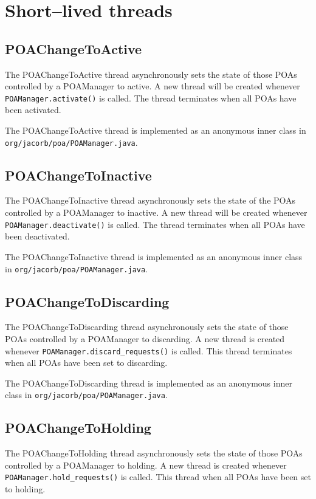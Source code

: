 \section*{Short--lived threads}

\subsection*{POAChangeToActive}
The POAChangeToActive thread asynchronously sets the state of those POAs
controlled by a POAManager to active. A new thread will be created whenever
{\tt POAManager.activate()} is called. The thread terminates when all POAs
have been activated.

The POAChangeToActive thread is implemented as an anonymous inner class in
{\tt org/jacorb/poa/POAManager.java}.

\subsection*{POAChangeToInactive}
The POAChangeToInactive thread asynchronously sets the state of the POAs
controlled by a POAManager to inactive. A new thread will be created whenever
{\tt POAManager.deactivate()} is called. The thread terminates when all
POAs have been deactivated.

The POAChangeToInactive thread is implemented as an anonymous inner class in
{\tt org/jacorb/poa/POAManager.java}.

\subsection*{POAChangeToDiscarding}
The POAChangeToDiscarding thread asynchronously sets the state of those POAs
controlled by a POAManager to discarding. A new thread is created whenever
{\tt POAManager.discard\_requests()} is called. This thread terminates when
all POAs have been set to discarding.

The POAChangeToDiscarding thread is implemented as an anonymous inner class in
{\tt org/jacorb/poa/POAManager.java}.

\subsection*{POAChangeToHolding}
The POAChangeToHolding thread asynchronously sets the state of those POAs
controlled by a POAManager to holding. A new thread is created whenever
{\tt POAManager.hold\_requests()} is called. This thread when all POAs have
been set to holding.

